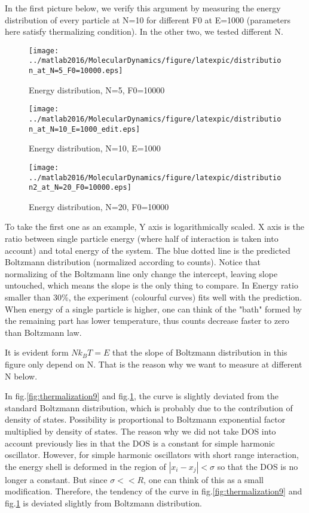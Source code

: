 \documentclass[a4paper,onecolumn,12pt]{article}
\begin{document}
In the first picture below, we verify this argument by measuring the energy distribution of every particle at N=10 for different F0 at E=1000 (parameters here satisfy thermalizing condition). In the other two, we tested different N.

\begin{figure}[hbtp]
\centering
\texttt{[image: ../matlab2016/MolecularDynamics/figure/latexpic/distribution\_at\_N=5\_F0=10000.eps]}
\caption{Energy distribution, N=5, F0=10000}
\label{fig:thermalization8}
\texttt{[image: ../matlab2016/MolecularDynamics/figure/latexpic/distribution\_at\_N=10\_E=1000\_edit.eps]}
\caption{Energy distribution, N=10, E=1000}
\label{fig:thermalization9}
\texttt{[image: ../matlab2016/MolecularDynamics/figure/latexpic/distribution2\_at\_N=20\_F0=10000.eps]} 
\caption{Energy distribution, N=20, F0=10000}
\label{fig:thermalization10}
\end{figure}

\begin{flushleft}
To take the first one as an example, Y axis is logarithmically scaled. X axis is the ratio between single particle energy (where half of interaction is taken into account) and total energy of the system. The blue dotted line is the predicted Boltzmann distribution (normalized according to counts). Notice that normalizing of the Boltzmann line only change the intercept, leaving slope untouched, which means the slope is the only thing to compare. In  Energy ratio smaller than 30\%, the experiment (colourful curves) fits well with the prediction. When energy of a single particle is higher, one can think of the "bath" formed by the remaining part has lower temperature, thus counts decrease faster to zero than Boltzmann law.

It is evident form $Nk_BT=E$ that the slope of Boltzmann distribution in this figure only depend on N. That is the reason why we want to measure at different N below. 

In fig.\ref{fig:thermalization9} and fig.\ref{fig:thermalization10}, the curve is slightly deviated from the standard Boltzmann distribution, which is probably due to the contribution of density of states. Possibility is proportional to Boltzmann exponential factor multiplied by density of states. The reason why we did not take DOS into account previously lies in that the DOS is a constant for simple harmonic oscillator. However, for simple harmonic oscillators with short range interaction, the energy shell is deformed in the region of $|x_i-x_j|<\sigma$ so that the DOS is no longer a constant. But since $\sigma<<R$, one can think of this as a small modification. Therefore, the tendency of the curve in fig.\ref{fig:thermalization9} and fig.\ref{fig:thermalization10} is deviated slightly from Boltzmann distribution.
 
\end{flushleft}
\end{document}
